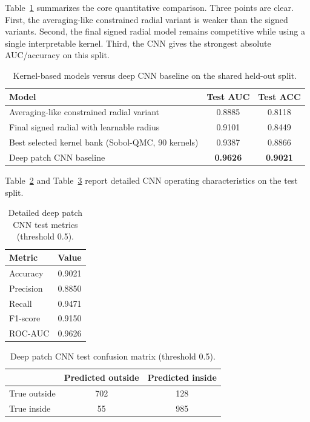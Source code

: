 \documentclass{cernatsnote}
\begin{document}
Table~\ref{tab:cnncomparison} summarizes the core quantitative comparison. Three points are clear. First, the averaging-like constrained radial variant is weaker than the signed variants. Second, the final signed radial model remains competitive while using a single interpretable kernel. Third, the CNN gives the strongest absolute AUC/accuracy on this split.

\begin{table}[H]
\centering
\caption{Kernel-based models versus deep CNN baseline on the shared held-out split.}
\label{tab:cnncomparison}
\begin{tabular}{lcc}
\toprule
Model & Test AUC & Test ACC \\
\midrule
Averaging-like constrained radial variant & 0.8885 & 0.8118 \\
Final signed radial with learnable radius & 0.9101 & 0.8449 \\
Best selected kernel bank (Sobol-QMC, 90 kernels) & 0.9387 & 0.8866 \\
Deep patch CNN baseline & \textbf{0.9626} & \textbf{0.9021} \\
\bottomrule
\end{tabular}
\end{table}

Table~\ref{tab:cnndetailed} and Table~\ref{tab:cnnconfusion} report detailed CNN operating characteristics on the test split.

\begin{table}[H]
\centering
\caption{Detailed deep patch CNN test metrics (threshold 0.5).}
\label{tab:cnndetailed}
\begin{tabular}{lc}
\toprule
Metric & Value \\
\midrule
Accuracy & 0.9021 \\
Precision & 0.8850 \\
Recall & 0.9471 \\
F1-score & 0.9150 \\
ROC-AUC & 0.9626 \\
\bottomrule
\end{tabular}
\end{table}

\begin{table}[H]
\centering
\caption{Deep patch CNN test confusion matrix (threshold 0.5).}
\label{tab:cnnconfusion}
\begin{tabular}{lcc}
\toprule
 & Predicted outside & Predicted inside \\
\midrule
True outside & 702 & 128 \\
True inside & 55 & 985 \\
\bottomrule
\end{tabular}
\end{table}
\end{document}
